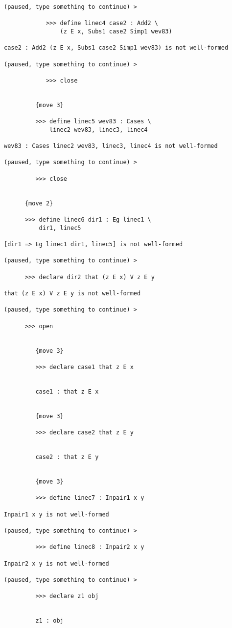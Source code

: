 \documentclass[12pt]{article}
\begin{document}
\begin{verbatim}
(paused, type something to continue) >

            >>> define linec4 case2 : Add2 \
                (z E x, Subs1 case2 Simp1 wev83)

case2 : Add2 (z E x, Subs1 case2 Simp1 wev83) is not well-formed

(paused, type something to continue) >

            >>> close


         {move 3}

         >>> define linec5 wev83 : Cases \
             linec2 wev83, linec3, linec4

wev83 : Cases linec2 wev83, linec3, linec4 is not well-formed

(paused, type something to continue) >

         >>> close


      {move 2}

      >>> define linec6 dir1 : Eg linec1 \
          dir1, linec5

[dir1 => Eg linec1 dir1, linec5] is not well-formed

(paused, type something to continue) >

      >>> declare dir2 that (z E x) V z E y

that (z E x) V z E y is not well-formed

(paused, type something to continue) >

      >>> open


         {move 3}

         >>> declare case1 that z E x


         case1 : that z E x


         {move 3}

         >>> declare case2 that z E y


         case2 : that z E y


         {move 3}

         >>> define linec7 : Inpair1 x y

Inpair1 x y is not well-formed

(paused, type something to continue) >

         >>> define linec8 : Inpair2 x y

Inpair2 x y is not well-formed

(paused, type something to continue) >

         >>> declare z1 obj


         z1 : obj



\end{verbatim}
\end{document}
